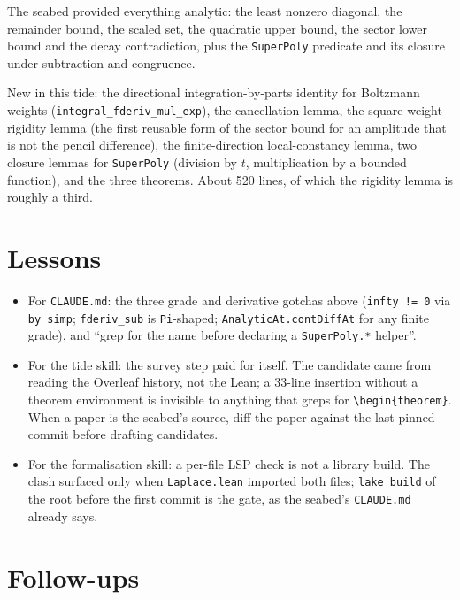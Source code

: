 \documentclass[11pt]{article}
\newcommand{\code}[1]{\texttt{#1}}
\begin{document}
The seabed provided everything analytic: the least nonzero diagonal,
the remainder bound, the scaled set, the quadratic upper bound, the
sector lower bound and the decay contradiction, plus the
\code{SuperPoly} predicate and its closure under subtraction and
congruence.

New in this tide: the directional integration-by-parts identity for
Boltzmann weights (\code{integral\_fderiv\_mul\_exp}), the cancellation
lemma, the square-weight rigidity lemma (the first reusable form of the
sector bound for an amplitude that is not the pencil difference), the
finite-direction local-constancy lemma, two closure lemmas for
\code{SuperPoly} (division by $t$, multiplication by a bounded
function), and the three theorems. About 520 lines, of which the
rigidity lemma is roughly a third.

\section{Lessons}

\begin{itemize}
\item For \code{CLAUDE.md}: the three grade and derivative gotchas above
(\code{infty != 0} via \code{by simp}; \code{fderiv\_sub} is \code{Pi}-shaped;
\code{AnalyticAt.contDiffAt} for any finite grade), and ``grep for the
name before declaring a \code{SuperPoly.*} helper''.
\item For the tide skill: the survey step paid for itself. The
candidate came from reading the Overleaf history, not the Lean; a
33-line insertion without a theorem environment is invisible to
anything that greps for \code{\textbackslash begin\{theorem\}}. When a
paper is the seabed's source, diff the paper against the last pinned
commit before drafting candidates.
\item For the formalisation skill: a per-file LSP check is not a
library build. The clash surfaced only when \code{Laplace.lean} imported
both files; \code{lake build} of the root before the first commit is
the gate, as the seabed's \code{CLAUDE.md} already says.
\end{itemize}

\section{Follow-ups}
\end{document}
